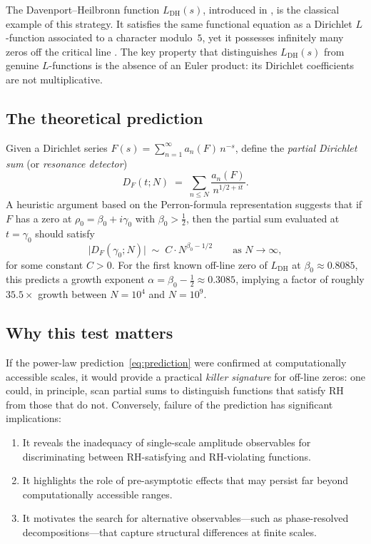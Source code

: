 \documentclass[11pt]{amsart}
\theoremstyle{definition}
\theoremstyle{remark}
\renewcommand{\DH}{\mathrm{DH}}
\newcommand{\abs}[1]{\lvert #1 \rvert}
\begin{document}
The Davenport--Heilbronn function $L_{\DH}(s)$, introduced in
\cite{DavenportHeilbronn1936}, is the classical example of this
strategy.  It satisfies the same functional equation as a Dirichlet
$L$-function associated to a character modulo~$5$, yet it possesses
infinitely many zeros off the critical line
\cite{Spira1994,BalanzarioSanchezOrtiz2007}.  The key property that
distinguishes $L_{\DH}(s)$ from genuine $L$-functions is the absence
of an Euler product: its Dirichlet coefficients are not multiplicative.

\subsection{The theoretical prediction}

Given a Dirichlet series $F(s) = \sum_{n=1}^{\infty} a_n(F)\, n^{-s}$,
define the \emph{partial Dirichlet sum} (or \emph{resonance detector})
\begin{equation}\label{eq:partial-sum}
  D_F(t; N) \;=\; \sum_{n \le N} \frac{a_n(F)}{n^{1/2 + it}}.
\end{equation}
A heuristic argument based on the Perron-formula representation
suggests that if $F$ has a zero at $\rho_0 = \beta_0 + i\gamma_0$
with $\beta_0 > \tfrac{1}{2}$, then the partial sum evaluated at
$t = \gamma_0$ should satisfy
\begin{equation}\label{eq:prediction}
  \abs{D_F(\gamma_0; N)} \;\sim\; C \cdot N^{\beta_0 - 1/2}
  \qquad \text{as } N \to \infty,
\end{equation}
for some constant $C > 0$.  For the first known off-line zero of
$L_{\DH}$ at $\beta_0 \approx 0.8085$, this predicts a growth
exponent $\alpha = \beta_0 - \tfrac{1}{2} \approx 0.3085$, implying a
factor of roughly $35.5\times$ growth between $N = 10^4$ and
$N = 10^9$.

\subsection{Why this test matters}

If the power-law prediction~\eqref{eq:prediction} were confirmed at
computationally accessible scales, it would provide a practical
\emph{killer signature} for off-line zeros: one could, in principle,
scan partial sums to distinguish functions that satisfy RH from those
that do not.  Conversely, failure of the prediction has significant
implications:
\begin{enumerate}[label=(\roman*)]
  \item It reveals the inadequacy of single-scale amplitude observables
    for discriminating between RH-satisfying and RH-violating functions.
  \item It highlights the role of pre-asymptotic effects that may
    persist far beyond computationally accessible ranges.
  \item It motivates the search for alternative observables---such as
    phase-resolved decompositions---that capture structural differences
    at finite scales.
\end{enumerate}
\end{document}
